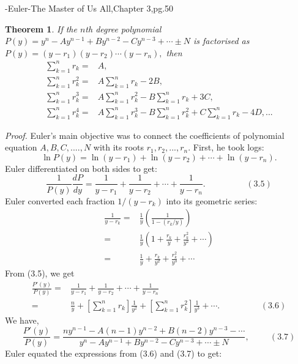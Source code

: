 \documentclass[a4paper,reqno,11pt]{book}
\theoremstyle{plain}%
\newtheorem{thm}{Theorem}[chapter]
\theoremstyle{definition}
\begin{document}
\vspace{2ex}
\hfill{-Euler-The Master of Us All,Chapter 3,pg.50}
\begin{thm}\label{thm : Type 1}If the $n$th degree polynomial $P(y) = y^n - Ay^{n-1} + By^{n-2} - Cy^{n-3} + \cdots \pm N$ is factorised as $P(y) = (y-r_{1})(y-r_{2})\cdots(y-r_{n}),$ then 
\begin{align*}
    \sum_{k=1}^{n}r_{k} =& A,\\
    \sum_{k=1}^{n}r_{k}^2 =& A\sum_{k=1}^{n}r_{k} - 2B,\\
    \sum_{k=1}^{n}r_{k}^3 =& A\sum_{k=1}^{n}r_{k}^2 - B\sum_{k=1}^{n}r_{k} + 3C,\\
    \sum_{k=1}^{n}r_{k}^4 =& A\sum_{k=1}^{n}r_{k}^3 -B\sum_{k=1}^{n}r_{k}^2 + C\sum_{k=1}^{n}r_{k} - 4D,...
    \end{align*}
    \end{thm}
\textit{Proof.}
Euler's main objective was to connect the coefficients of polynomial equation $A,B,C,....,N$ with its roots $r_{1},r_{2},...,r_{n}.$ First, he took logs:\\
$$\ln P(y) = \ln(y-r_{1}) + \ln(y-r_{2}) + \cdots +\ln(y-r_{n}).$$
Euler differentiated on both sides to get:\\
$$\frac{1}{P(y)}\frac{dP}{dy} = \frac{1}{y-r_{1}} + \frac{1}{y-r_{2}} + \cdots + \frac{1}{y-r_{n}}. \hspace{2cm} (3.5) $$
Euler converted each fraction $1/ (y -r_{k})$ into its geometric series: 
\begin{align*}
 \frac{1}{y-r_{k}} =& \frac{1}{y}\left(\frac{1}{1-(r_{k}/y)}\right)\\
 =& \frac{1}{y}\left(1 + \frac{r_{k}}{y} + \frac{r_{k}^2}{y^2} + \cdots\right)\\
 =& \frac{1}{y} + \frac{r_{k}}{y^2} + \frac{r_{k}^2}{y^3} + \cdots
 \end{align*}
 From (3.5), we get
\begin{align*}
\frac{P'(y)}{P(y)} =& \frac{1}{y-r_{1}} + \frac{1}{y-r_{2}} + \cdots + \frac{1}{y-r_{n}}\\
 =& \frac{n}{y} + [\sum_{k=1}^{n}r_{k}]\frac{1}{y^2} + [\sum_{k=1}^{n}r_{k}^2]\frac{1}{y^3} + \cdots. \hspace{2cm} (3.6)
 \end{align*}
We have,\\
$$\frac{P'(y)}{P(y)} = \frac{ny^{n-1} - A(n-1)y^{n-2} + B(n-2)y^{n-3} - \cdots}{y^n - Ay^{n-1} + By^{n-2} - Cy^{n-3} + \cdots \pm N}, \hspace{1cm} (3.7)$$
Euler equated the expressions from (3.6) and (3.7) to get:\\
\end{document}
